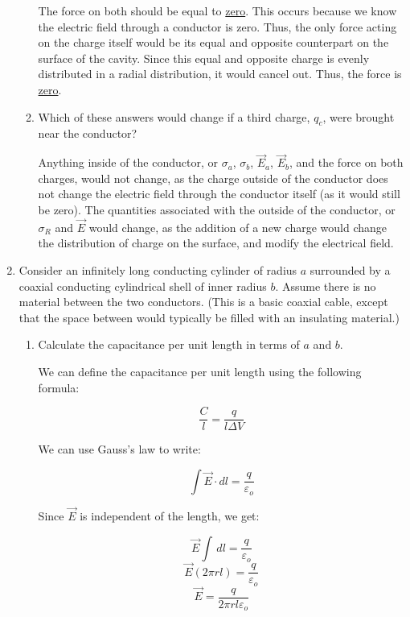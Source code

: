 \begin{enumerate}
\begin{enumerate}
        The force on both should be equal to \underline{zero}. This occurs because we know the electric field through a conductor is zero. Thus, the only force acting on the charge itself would be its equal and opposite counterpart on the surface of the cavity. Since this equal and opposite charge is evenly distributed in a radial distribution, it would cancel out. Thus, the force is \underline{zero}.

      \item Which of these answers would change if a third charge, $q_c$, were brought near the conductor?

        Anything inside of the conductor, or $\sigma_a$, $\sigma_b$, $\vec{E}_a$, $\vec{E}_b$, and the force on both charges, would not change, as the charge outside of the conductor does not change the electric field through the conductor itself (as it would still be zero). The quantities associated with the outside of the conductor, or $\sigma_R$ and $\vec{E}$ would change, as the addition of a new charge would change the distribution of charge on the surface, and modify the electrical field.

    \end{enumerate}

  \item Consider an infinitely long conducting cylinder of radius $a$ surrounded by a coaxial conducting cylindrical shell of inner radius $b$. Assume there is no material between the two conductors.  (This is a basic coaxial cable, except that the space between would typically be filled with an insulating material.)

    \begin{enumerate}

      \item Calculate the capacitance per unit length in terms of $a$ and $b$.

        We can define the capacitance per unit length using the following formula:

        $$\frac{C}{l}=\frac{q}{l\Delta V}$$

        We can use Gauss's law to write:

        $$\int \vec{E}\cdot dl=\frac{q}{\varepsilon_o}$$

        Since $\vec{E}$ is independent of the length, we get:

        $$\vec{E}\int\,dl=\frac{q}{\varepsilon_o}$$
        $$\vec{E}(2\pi r l)=\frac{q}{\varepsilon_o}$$
        $$\vec{E}=\frac{q}{2\pi r l\varepsilon_o}$$


\end{enumerate}
\end{enumerate}
